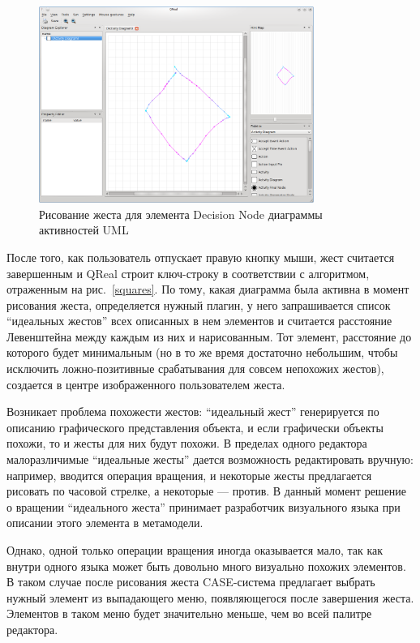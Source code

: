 \documentclass[a5paper]{article}
\begin{document}
\begin{figure} [ht]
  \begin{center}
    \includegraphics[width=0.8\textwidth, bb=0 0 800 600]{05-drawing.png}
    \caption{Рисование жеста для элемента Decision Node диаграммы активностей UML}
    \label{drawing}
  \end{center}
\end{figure}

После того, как пользователь отпускает правую кнопку мыши, жест считается завершенным и QReal строит ключ-строку в соответствии с алгоритмом,
отраженным на рис.~\ref{squares}. По тому, какая диаграмма была активна в момент рисования жеста, определяется нужный плагин, у него 
запрашивается список ``идеальных жестов'' всех описанных в нем элементов и считается расстояние Левенштейна между каждым из них и нарисованным. 
Тот элемент, расстояние до которого будет минимальным (но в то же время достаточно небольшим, чтобы исключить ложно-позитивные срабатывания 
для совсем непохожих жестов), создается в центре изображенного пользователем жеста. 

Возникает проблема похожести жестов: ``идеальный жест'' генерируется по описанию графического представления объекта, и если графически 
объекты похожи, то и жесты для них будут похожи. В пределах одного редактора малоразличимые ``идеальные жесты'' дается возможность редактировать 
вручную: например, вводится операция вращения, и некоторые жесты предлагается рисовать по часовой стрелке, а некоторые --- против. В данный 
момент решение о вращении ``идеального жеста'' принимает разработчик визуального языка при описании этого элемента 
в метамодели. 

Однако, одной только операции вращения иногда оказывается мало, так как внутри одного языка может быть довольно много
визуально похожих элементов. В таком случае после рисования жеста CASE-система предлагает выбрать нужный элемент из выпадающего меню, 
появляющегося после завершения жеста. Элементов в таком меню будет значительно меньше, чем во всей палитре редактора.
\end{document}

